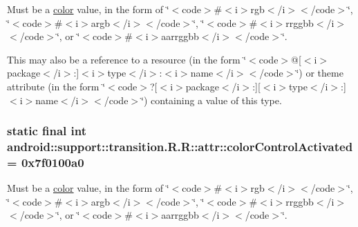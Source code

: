 Must be a \hyperlink{classandroid_1_1support_1_1transition_1_1_r_1_1color}{color} value, in the form of \char`\"{}$<$code$>$\#$<$i$>$rgb$<$/i$>$$<$/code$>$\char`\"{}, \char`\"{}$<$code$>$\#$<$i$>$argb$<$/i$>$$<$/code$>$\char`\"{}, \char`\"{}$<$code$>$\#$<$i$>$rrggbb$<$/i$>$$<$/code$>$\char`\"{}, or \char`\"{}$<$code$>$\#$<$i$>$aarrggbb$<$/i$>$$<$/code$>$\char`\"{}. 

This may also be a reference to a resource (in the form \char`\"{}$<$code$>$@\mbox{[}$<$i$>$package$<$/i$>$:\mbox{]}$<$i$>$type$<$/i$>$:$<$i$>$name$<$/i$>$$<$/code$>$\char`\"{}) or theme attribute (in the form \char`\"{}$<$code$>$?\mbox{[}$<$i$>$package$<$/i$>$:\mbox{]}\mbox{[}$<$i$>$type$<$/i$>$:\mbox{]}$<$i$>$name$<$/i$>$$<$/code$>$\char`\"{}) containing a value of this type. \hypertarget{classandroid_1_1support_1_1transition_1_1_r_1_1attr_de1f4868abefef923eb740a483282a7b}{
\subsubsection[{colorControlActivated}]{\setlength{\rightskip}{0pt plus 5cm}static final int android::support::transition.R.R::attr::colorControlActivated = 0x7f0100a0}}
\label{classandroid_1_1support_1_1transition_1_1_r_1_1attr_de1f4868abefef923eb740a483282a7b}


Must be a \hyperlink{classandroid_1_1support_1_1transition_1_1_r_1_1color}{color} value, in the form of \char`\"{}$<$code$>$\#$<$i$>$rgb$<$/i$>$$<$/code$>$\char`\"{}, \char`\"{}$<$code$>$\#$<$i$>$argb$<$/i$>$$<$/code$>$\char`\"{}, \char`\"{}$<$code$>$\#$<$i$>$rrggbb$<$/i$>$$<$/code$>$\char`\"{}, or \char`\"{}$<$code$>$\#$<$i$>$aarrggbb$<$/i$>$$<$/code$>$\char`\"{}. 

